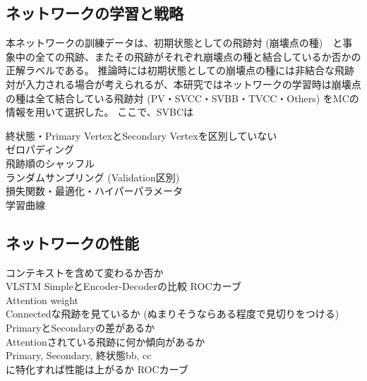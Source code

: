 \subsection{ネットワークの学習と戦略} \label{Net:VLSTM:TrainingandStrategyofVLSTM}

本ネットワークの訓練データは、初期状態としての飛跡対 (崩壊点の種)　と事象中の全ての飛跡、またその飛跡がそれぞれ崩壊点の種と結合しているか否かの正解ラベルである。
推論時には初期状態としての崩壊点の種には非結合な飛跡対が入力される場合が考えられるが、本研究ではネットワークの学習時は崩壊点の種は全て結合している飛跡対 (PV・SVCC・SVBB・TVCC・Others) をMCの情報を用いて選択した。
ここで、SVBCは

終状態・Primary VertexとSecondary Vertexを区別していない\\
ゼロパディング\\
飛跡順のシャッフル\\
ランダムサンプリング (Validation区別)\\

損失関数・最適化・ハイパーパラメータ\\

学習曲線\\

\subsection{ネットワークの性能} \label{Net:VLSTM:PerformanceofVLSTM}

コンテキストを含めて変わるか否か\\
VLSTM SimpleとEncoder-Decoderの比較 ROCカーブ\\

Attention weight\\
Connectedな飛跡を見ているか (ぬまりそうならある程度で見切りをつける)\\
PrimaryとSecondaryの差があるか\\
Attentionされている飛跡に何か傾向があるか\\

Primary, Secondary, 終状態bb, cc\\
に特化すれば性能は上がるか ROCカーブ\\









